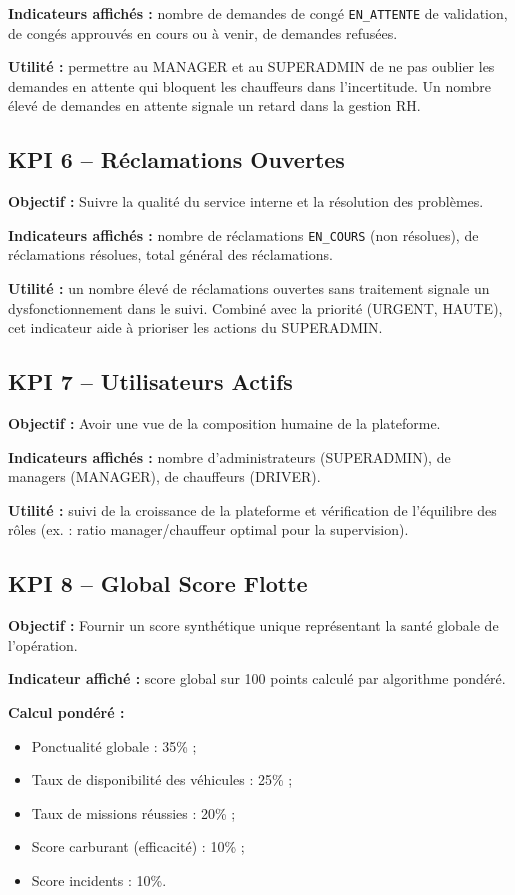 \documentclass[12pt,a4paper]{report}
\begin{document}
\textbf{Indicateurs affichés :} nombre de demandes de congé
\texttt{EN\_ATTENTE} de validation, de congés approuvés en cours ou à
venir, de demandes refusées.

\textbf{Utilité :} permettre au MANAGER et au SUPERADMIN de ne pas oublier
les demandes en attente qui bloquent les chauffeurs dans l'incertitude.
Un nombre élevé de demandes en attente signale un retard dans la gestion RH.

\subsection{KPI 6 -- Réclamations Ouvertes}

\textbf{Objectif :} Suivre la qualité du service interne et la résolution
des problèmes.

\textbf{Indicateurs affichés :} nombre de réclamations \texttt{EN\_COURS}
(non résolues), de réclamations résolues, total général des réclamations.

\textbf{Utilité :} un nombre élevé de réclamations ouvertes sans traitement
signale un dysfonctionnement dans le suivi. Combiné avec la priorité
(URGENT, HAUTE), cet indicateur aide à prioriser les actions du SUPERADMIN.

\subsection{KPI 7 -- Utilisateurs Actifs}

\textbf{Objectif :} Avoir une vue de la composition humaine de la plateforme.

\textbf{Indicateurs affichés :} nombre d'administrateurs (SUPERADMIN), de
managers (MANAGER), de chauffeurs (DRIVER).

\textbf{Utilité :} suivi de la croissance de la plateforme et vérification
de l'équilibre des rôles (ex. : ratio manager/chauffeur optimal pour la
supervision).

\subsection{KPI 8 -- Global Score Flotte}

\textbf{Objectif :} Fournir un score synthétique unique représentant la
santé globale de l'opération.

\textbf{Indicateur affiché :} score global sur 100 points calculé par
algorithme pondéré.

\textbf{Calcul pondéré :}
\begin{itemize}
  \item Ponctualité globale : 35\% ;
  \item Taux de disponibilité des véhicules : 25\% ;
  \item Taux de missions réussies : 20\% ;
  \item Score carburant (efficacité) : 10\% ;
  \item Score incidents : 10\%.
\end{itemize}
\end{document}
